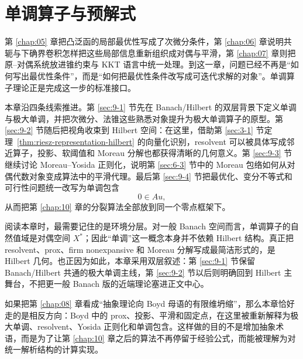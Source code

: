 \chapter{单调算子与预解式}

\label{chap:09}

第 \ref{chap:05} 章把凸泛函的局部最优性写成了次微分条件，第 \ref{chap:06} 章说明共轭与下确界卷积怎样把这些局部信息重新组织成对偶与平滑，第 \ref{chap:07} 章则把原--对偶系统放进锥约束与 KKT 语言中统一处理。到这一章，问题已经不再是“如何写出最优性条件”，而是“如何把最优性条件改写成可迭代求解的对象”。单调算子理论正是完成这一步的标准接口。

本章沿四条线索推进。第 \ref{sec:9-1} 节先在 Banach/Hilbert 的双层背景下定义单调与极大单调，并把次微分、法锥这些熟悉对象提升为极大单调算子的原型。第 \ref{sec:9-2} 节随后把视角收束到 Hilbert 空间：在这里，借助第 \ref{sec:3-1} 节定理~\ref{thm:riesz-representation-hilbert} 的向量化识别，resolvent 可以被具体写成邻近算子，投影、软阈值和 Moreau 分解也都获得清晰的几何意义。第 \ref{sec:9-3} 节继续讨论 Moreau--Yosida 正则化，说明第 \ref{sec:6-3} 节中的 Moreau 包络如何从对偶代数对象变成算法中的平滑代理。最后第 \ref{sec:9-4} 节把最优化、变分不等式和可行性问题统一改写为单调包含
\[
0\in Au,
\]
从而把第 \ref{chap:10} 章的分裂算法全部放到同一个零点框架下。

阅读本章时，最需要记住的是环境分层。对一般 Banach 空间而言，单调算子的自然值域是对偶空间 $X^\ast$；因此“单调”这一概念本身并不依赖 Hilbert 结构。真正把 resolvent、prox、firm nonexpansive 和 Moreau 分解写成最简洁形式的，是 Hilbert 几何。也正因为如此，本章采用双层叙述：第 \ref{sec:9-1} 节保留 Banach/Hilbert 共通的极大单调主线，第 \ref{sec:9-2} 节以后则明确回到 Hilbert 主舞台，不把更一般 Banach 版的近端理论塞进正文中心。

如果把第 \ref{chap:08} 章看成“抽象理论向 Boyd 母语的有限维坍缩”，那么本章恰好走的是相反方向：Boyd 中的 prox、投影、平滑和固定点，在这里被重新解释为极大单调、resolvent、Yosida 正则化和单调包含。这样做的目的不是增加抽象术语，而是为了让第 \ref{chap:10} 章之后的算法不再停留于经验公式，而能被理解为对统一解析结构的计算实现。








